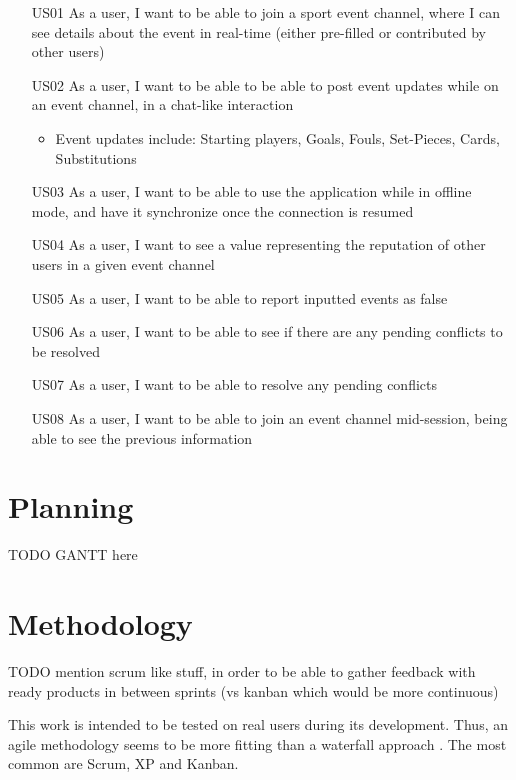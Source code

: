 \begin{itemize}[leftmargin  = 3.25\parindent, align=left]
    \item[US01] As a user, I want to be able to join a sport event channel, where I can see details about the event in real-time (either pre-filled or contributed by other users)
    \item[US02] As a user, I want to be able to be able to post event updates while on an event channel, in a chat-like interaction
    \begin{itemize}
        \item Event updates include: Starting players, Goals, Fouls, Set-Pieces, Cards, Substitutions
    \end{itemize} 
    \item[US03] As a user, I want to be able to use the application while in offline mode, and have it synchronize once the connection is resumed
    \item[US04] As a user, I want to see a value representing the reputation of other users in a given event channel
    \item[US05] As a user, I want to be able to report inputted events as false
    \item[US06] As a user, I want to be able to see if there are any pending conflicts to be resolved
    \item[US07] As a user, I want to be able to resolve any pending conflicts
    \item[US08] As a user, I want to be able to join an event channel mid-session, being able to see the previous information
\end{itemize}

\section{Planning}\label{sec:prob-planning}

TODO
GANTT here

\section{Methodology}\label{sec:prob-methodology}

TODO
mention scrum like stuff, in order to be able to gather feedback with ready products in between sprints (vs kanban which would be more continuous)


This work is intended to be tested on real users during its development. Thus, an agile methodology seems to be more fitting than a waterfall approach \cite{beck2001agile}. The most common are Scrum, XP and Kanban.

